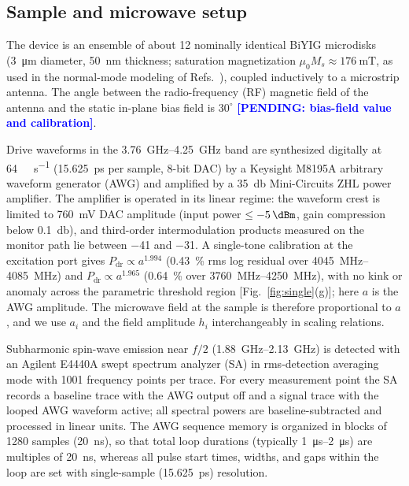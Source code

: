\documentclass[aps,prb,reprint,superscriptaddress,floatfix]{revtex4-2}
\newcommand{\pend}[1]{\textcolor{blue}{\textbf{[PENDING: #1]}}}
\newcommand{\pend}[1]{}
\begin{document}
\subsection{Sample and microwave setup}\label{sec:setup}

The device is an ensemble of about 12 nominally identical BiYIG microdisks (\SI{3}{\micro\metre} diameter, \SI{50}{\nano\metre} thickness; saturation magnetization $\mu_0M_s\approx\SI{176}{\milli\tesla}$, as used in the normal-mode modeling of Refs.~\cite{perna22,yemeli25}), coupled inductively to a microstrip antenna. The angle between the radio-frequency (RF) magnetic field of the antenna and the static in-plane bias field is $30^\circ$ \pend{bias-field value and calibration}.

Drive waveforms in the \SIrange{3.76}{4.25}{\giga\hertz} band are synthesized digitally at \SI{64}{\giga\sample\per\second} (\SI{15.625}{\pico\second} per sample, 8-bit DAC) by a Keysight M8195A arbitrary waveform generator (AWG) and amplified by a \SI{35}{\decibel} Mini-Circuits ZHL power amplifier. The amplifier is operated in its linear regime: the waveform crest is limited to \SI{760}{\milli\volt} DAC amplitude (input power $\le\SI{-5}{\dBm}$, gain compression below \SI{0.1}{\decibel}), and third-order intermodulation products measured on the monitor path lie between \SI{-41}{\dBc} and \SI{-31}{\dBc}. A single-tone calibration at the excitation port gives $P_{\mathrm{dr}}\propto a^{1.994}$ (\SI{0.43}{\percent} rms log residual over \SIrange{4045}{4085}{\mega\hertz}) and $P_{\mathrm{dr}}\propto a^{1.965}$ (\SI{0.64}{\percent} over \SIrange{3760}{4250}{\mega\hertz}), with no kink or anomaly across the parametric threshold region [Fig.~\ref{fig:single}(g)]; here $a$ is the AWG amplitude. The microwave field at the sample is therefore proportional to $a$, and we use $a_i$ and the field amplitude $h_i$ interchangeably in scaling relations.

Subharmonic spin-wave emission near $f/2$ (\SIrange{1.88}{2.13}{\giga\hertz}) is detected with an Agilent E4440A swept spectrum analyzer (SA) in rms-detection averaging mode with 1001 frequency points per trace. For every measurement point the SA records a baseline trace with the AWG output off and a signal trace with the looped AWG waveform active; all spectral powers are baseline-subtracted and processed in linear units. The AWG sequence memory is organized in blocks of 1280 samples (\SI{20}{\nano\second}), so that total loop durations (typically \SIrange{1}{2}{\micro\second}) are multiples of \SI{20}{\nano\second}, whereas all pulse start times, widths, and gaps within the loop are set with single-sample (\SI{15.625}{\pico\second}) resolution.
\end{document}
